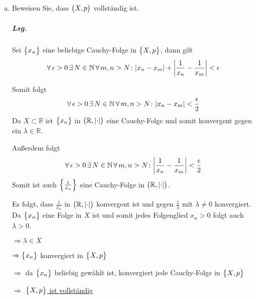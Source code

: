 \documentclass{scrreprt}
\begin{document}
\begin{enumerate}[(a)]
\item Beweisen Sie, dass $\qty\big(X, p)$ vollständig ist.

  \subparagraph{Lsg.} Sei $\qty\big{x_n}$ eine beliebige Cauchy-Folge in
  $\qty\big{X, p}$, dann gilt
  \[
    \forall \, \epsilon > 0 \, \exists \, N \in \mathbb{N} \, \forall \, m, n > N
    \colon \abs{x_n - x_m} + \abs{\frac{1}{x_n} - \frac{1}{x_m}} < \epsilon
  \]

  Somit folgt
  \[
    \forall \, \epsilon > 0 \, \exists \, N \in \mathbb{N} \, \forall \, m, n > N
    \colon \abs{x_n - x_m} < \frac{\epsilon}{2}
  \]
  Da $X \subset \mathbb{R}$ ist $\qty\big{x_n}$ in
  $\qty\big(\mathbb{R}, \abs{\cdot})$ eine Cauchy-Folge und somit konvergent
  gegen ein $\lambda \in \mathbb{R}$.

  \newpage
  Außerdem folgt
  \[
    \forall \, \epsilon > 0 \, \exists \, N \in \mathbb{N} \, \forall \, m, n > N
    \colon \abs{\frac{1}{x_n} - \frac{1}{x_m}} < \frac{\epsilon}{2}
  \]
  Somit ist auch $\qty{\frac{1}{x_n}}$ eine Cauchy-Folge in
  $\qty\big(\mathbb{R}, \abs{\cdot})$.

  Es folgt, dass $\frac{1}{x_n}$ in $\qty\big(\mathbb{R}, \abs{\cdot})$
  konvergent ist und gegen $\frac{1}{\lambda}$ mit $\lambda \ne 0$ konvergiert.
  Da $\qty\big{x_n}$ eine Folge in $X$ ist und somit jedes Folgenglied $x_n > 0$
  folgt auch $\lambda > 0$.

  $\Rightarrow \lambda \in X$

  $\Rightarrow \qty\big{x_n}$ konvergiert in $\qty\big{X, p}$

  $\Rightarrow$ da $\qty\big{x_n}$ beliebig gewählt ist,  konvergiert jede
  Cauchy-Folge in $\qty\big{X, p}$

  $\Rightarrow$ \underline{$\qty\big{X, p}$ ist vollständig}
\end{enumerate}
\end{document}
